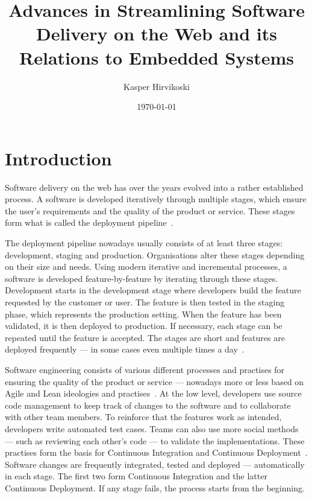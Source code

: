 \documentclass[english]{tktltiki2}
\title{Advances in Streamlining Software Delivery on the Web and its Relations to Embedded Systems}
\author{Kasper Hirvikoski}
\date{\today}
\begin{document}

\frontmatter

\maketitle
\setcounter{page}{2}
\makeabstract

\tableofcontents


\mainmatter


\section{Introduction}

Software delivery on the web has over the years evolved into a rather established process. A software is developed iteratively through multiple stages, which ensure the user’s requirements and the quality of the product or service. These stages form what is called the deployment pipeline~\cite{Fow06, HF11, Fow13a, Fow13b}.

The deployment pipeline nowadays usually consists of at least three stages: development, staging and production. Organisations alter these stages depending on their size and needs. Using modern iterative and incremental processes, a software is developed feature-by-feature by iterating through these stages. Development starts in the development stage where developers build the feature requested by the customer or user. The feature is then tested in the staging phase, which represents the production setting. When the feature has been validated, it is then deployed to production. If necessary, each stage can be repeated until the feature is accepted. The stages are short and features are deployed frequently — in some cases even multiple times a day~\cite{OR11, Sny13, Rub14}.

Software engineering consists of various different processes and practises for ensuring the quality of the product or service — nowadays more or less based on Agile and Lean ideologies and practises~\cite{BBB01a, Fow05, Mon12}. At the low level, developers use source code management to keep track of changes to the software and to collaborate with other team members. To reinforce that the features work as intended, developers write automated test cases. Teams can also use more social methods — such as reviewing each other’s code — to validate the implementations. These practises form the basis for Continuous Integration and Continuous Deployment~\cite{Fow06, HF11, Fow13a, Fow13b}. Software changes are frequently integrated, tested and deployed — automatically in each stage. The first two form Continuous Integration and the latter Continuous Deployment. If any stage fails, the process starts from the beginning.
\end{document}
